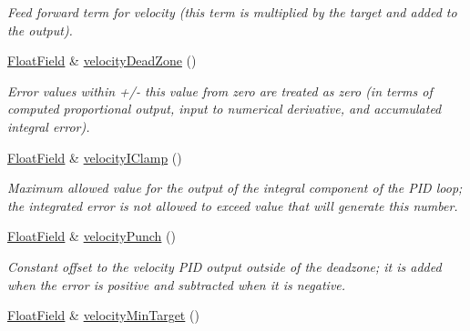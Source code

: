 \begin{DoxyCompactItemize}
\begin{DoxyCompactList}\small\item\em Feed forward term for velocity (this term is multiplied by the target and added to the output). \end{DoxyCompactList}\item 
\hyperlink{classhebi_1_1Command_1_1FloatField}{Float\+Field} \& \hyperlink{classhebi_1_1Command_1_1Settings_1_1Actuator_1_1VelocityGains_a2ea73387738ea5cbb084d8e50f077a7b}{velocity\+Dead\+Zone} ()\hypertarget{classhebi_1_1Command_1_1Settings_1_1Actuator_1_1VelocityGains_a2ea73387738ea5cbb084d8e50f077a7b}{}\label{classhebi_1_1Command_1_1Settings_1_1Actuator_1_1VelocityGains_a2ea73387738ea5cbb084d8e50f077a7b}

\begin{DoxyCompactList}\small\item\em Error values within +/-\/ this value from zero are treated as zero (in terms of computed proportional output, input to numerical derivative, and accumulated integral error). \end{DoxyCompactList}\item 
\hyperlink{classhebi_1_1Command_1_1FloatField}{Float\+Field} \& \hyperlink{classhebi_1_1Command_1_1Settings_1_1Actuator_1_1VelocityGains_a2a5006c5ea06bfb46696c5afe1ebea03}{velocity\+I\+Clamp} ()\hypertarget{classhebi_1_1Command_1_1Settings_1_1Actuator_1_1VelocityGains_a2a5006c5ea06bfb46696c5afe1ebea03}{}\label{classhebi_1_1Command_1_1Settings_1_1Actuator_1_1VelocityGains_a2a5006c5ea06bfb46696c5afe1ebea03}

\begin{DoxyCompactList}\small\item\em Maximum allowed value for the output of the integral component of the P\+ID loop; the integrated error is not allowed to exceed value that will generate this number. \end{DoxyCompactList}\item 
\hyperlink{classhebi_1_1Command_1_1FloatField}{Float\+Field} \& \hyperlink{classhebi_1_1Command_1_1Settings_1_1Actuator_1_1VelocityGains_a60aac6765a0d1679a57fd4c14ae96ed9}{velocity\+Punch} ()\hypertarget{classhebi_1_1Command_1_1Settings_1_1Actuator_1_1VelocityGains_a60aac6765a0d1679a57fd4c14ae96ed9}{}\label{classhebi_1_1Command_1_1Settings_1_1Actuator_1_1VelocityGains_a60aac6765a0d1679a57fd4c14ae96ed9}

\begin{DoxyCompactList}\small\item\em Constant offset to the velocity P\+ID output outside of the deadzone; it is added when the error is positive and subtracted when it is negative. \end{DoxyCompactList}\item 
\hyperlink{classhebi_1_1Command_1_1FloatField}{Float\+Field} \& \hyperlink{classhebi_1_1Command_1_1Settings_1_1Actuator_1_1VelocityGains_a8e08b9592e6a33c54e35267b8fb1e2a2}{velocity\+Min\+Target} ()\hypertarget{classhebi_1_1Command_1_1Settings_1_1Actuator_1_1VelocityGains_a8e08b9592e6a33c54e35267b8fb1e2a2}{}\label{classhebi_1_1Command_1_1Settings_1_1Actuator_1_1VelocityGains_a8e08b9592e6a33c54e35267b8fb1e2a2}


\end{DoxyCompactItemize}
